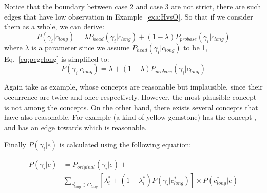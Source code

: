 Notice that the boundary between case 2 and case 3 are not strict, there are such edges that have low observation in Example~\ref{exa:HvsO}. So that if we consider them as a whole, we can derive:
\begin{equation} P(\gamma_i|c_{long})=\lambda P_{head}(\gamma_i|c_{long})+(1-\lambda)P_{probase}(\gamma_i|c_{long}) \label{eq:pcgclong}\end{equation}
where $\lambda$ is a parameter  since we assume $P_{head}(\gamma_i|c_{long})$ to be 1, Eq.~\ref{eq:pcgclong} is simplified to:
$$P(\gamma_i|c_{long})=\lambda  +(1-\lambda)P_{probase}(\gamma_i|c_{long}) $$



\begin{example}
\label{exa:HvsO}
Again take  as example, whose concepts  are reasonable but implausible, since their occurrence are twice and once respectively. However, the most plausible concept  is not among the concepts. On the other hand, there exists several concepts that have also reasonable. For example (a kind of yellow gemstone) has the concept , and  has an edge towards  which is reasonable.
\end{example}


Finally  $P(\gamma_i|e)$ is calculated using the following equation:

\begin{equation}
\begin{split}
P(\gamma_i|e) &= P_{original}(\gamma_i|e)+\\& \sum_{ c_{long}^*\in C_{long} } [ \lambda_{i}^*+(1-\lambda_{i}^*) P(\gamma_i|c_{long}^*) ] \times  P(c_{long}^*|e)
\end{split}
\label{eq:pgge}\end{equation}



